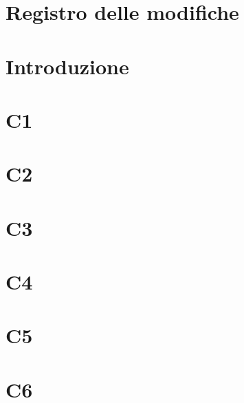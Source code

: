 \documentclass[a4paper, oneside, openany, dvipsnames, table]{article}
\begin{document}
\copertina{}

\section*{Registro delle modifiche}\label{sec:Registro-modifiche}


\newpage
\tableofcontents

\newpage
\section{Introduzione}\label{sec:Introduzione}


\newpage
\section{C1}\label{sec:C1}


\newpage
\section{C2}\label{sec:C2}


\newpage
\section{C3}\label{sec:C3}


\newpage
\section{C4}\label{sec:C4}


\newpage
\section{C5}\label{sec:C5}


\newpage
\section{C6}\label{sec:C6}

\end{document}
